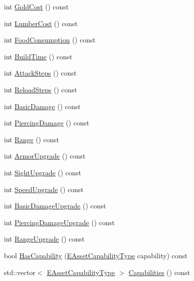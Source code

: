 \begin{DoxyCompactItemize}
\item 
int \hyperlink{classCPlayerAssetType_ad8458f72d16825d3c677a75967cf6227}{Gold\+Cost} () const
\item 
int \hyperlink{classCPlayerAssetType_a0263936149918ed7fe3844bcd0e15d72}{Lumber\+Cost} () const
\item 
int \hyperlink{classCPlayerAssetType_aa42527737b1518ce4d5aa8533bd9bb30}{Food\+Consumption} () const
\item 
int \hyperlink{classCPlayerAssetType_a810984e76d036da68dec6f03ebf6c1a6}{Build\+Time} () const
\item 
int \hyperlink{classCPlayerAssetType_a34306f4689aaa073ac0f28c10dda57d0}{Attack\+Steps} () const
\item 
int \hyperlink{classCPlayerAssetType_a2e6670a72cb6e48cc481ee398db2f2ab}{Reload\+Steps} () const
\item 
int \hyperlink{classCPlayerAssetType_add63aee5f0b58f91d67a136da9ae318d}{Basic\+Damage} () const
\item 
int \hyperlink{classCPlayerAssetType_a0ccf10706b29374191644fb6ef2d4132}{Piercing\+Damage} () const
\item 
int \hyperlink{classCPlayerAssetType_aa0e5a5e791c506dc5ac76d46ac6e719a}{Range} () const
\item 
int \hyperlink{classCPlayerAssetType_a976e906f40a84bfa3e675d563e7eb422}{Armor\+Upgrade} () const
\item 
int \hyperlink{classCPlayerAssetType_ac8789fc617ebd7b64f95bb1c1d95174d}{Sight\+Upgrade} () const
\item 
int \hyperlink{classCPlayerAssetType_a3c98952e1a08cca0562f80db67451e0e}{Speed\+Upgrade} () const
\item 
int \hyperlink{classCPlayerAssetType_a0192995a2cfc976d67753fc105e83082}{Basic\+Damage\+Upgrade} () const
\item 
int \hyperlink{classCPlayerAssetType_a6194b4de23ad6a2e2966a868d0fe8d32}{Piercing\+Damage\+Upgrade} () const
\item 
int \hyperlink{classCPlayerAssetType_a85643bb4b6dc70561603f6567bc7358a}{Range\+Upgrade} () const
\item 
bool \hyperlink{classCPlayerAssetType_a0b5669f6ac23405b854a976c13f43631}{Has\+Capability} (\hyperlink{GameDataTypes_8h_a35b98ce26aca678b03c6f9f76e4778ce}{E\+Asset\+Capability\+Type} capability) const
\item 
std\+::vector$<$ \hyperlink{GameDataTypes_8h_a35b98ce26aca678b03c6f9f76e4778ce}{E\+Asset\+Capability\+Type} $>$ \hyperlink{classCPlayerAssetType_a361c91efd5482b2c5840e33e7f6a11ad}{Capabilities} () const

\end{DoxyCompactItemize}
